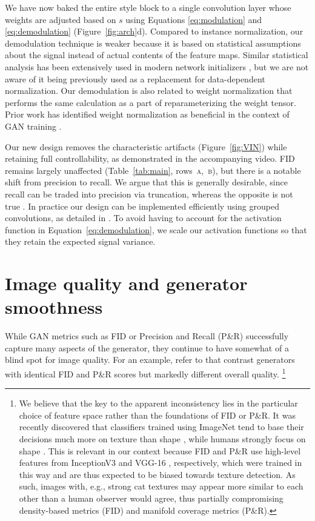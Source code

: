\documentclass[10pt,twocolumn,letterpaper]{article}
\newcommand{\arch}[1]{\textsc{#1}}
\begin{document}
\tabmain %

We have now baked the entire style block to a single convolution layer whose weights are adjusted based on $s$ using Equations \ref{eq:modulation} and \ref{eq:demodulation} (Figure~\ref{fig:arch}d). Compared to instance normalization, our demodulation technique is weaker because it is based on statistical assumptions about the signal instead of actual contents of the feature maps. Similar statistical analysis has been extensively used in modern network initializers \cite{Glorot2010,He2015}, but we are not aware of it being previously used as a replacement for data-dependent normalization.
Our demodulation is also related to weight normalization \cite{Salimans2016A} that performs the same calculation as a part of reparameterizing the weight tensor.
Prior work has identified weight normalization as beneficial in the context of GAN training \cite{Xiang2017}.

Our new design removes the characteristic artifacts (Figure~\ref{fig:VIN}) while retaining full controllability, as demonstrated in the accompanying video.
FID remains largely unaffected (Table~\ref{tab:main}, rows~\arch{a},~\arch{b}), but there is a notable shift from precision to recall.
We argue that this is generally desirable, since recall can be traded into precision via truncation, whereas the opposite is not true \cite{Tuomas2019}.
In practice our design can be implemented efficiently using grouped convolutions, as detailed in .
To avoid having to account for the activation function in Equation~\ref{eq:demodulation}, we scale our activation functions so that they retain the expected signal variance.

\section{Image quality and generator smoothness}
\label{sec:Greg}

\figVIN  %

While GAN metrics such as FID or Precision and Recall (P\&R) successfully capture many aspects of the generator, they continue to have somewhat of a blind spot for image quality. For an example, refer to 
 that contrast generators with identical FID and P\&R scores but markedly different overall quality.%
\footnote{%
We believe that the key to the apparent inconsistency lies in the particular choice of feature space rather than the foundations of FID or P\&R.
It was recently discovered that classifiers trained using ImageNet \cite{Russakovsky2014} tend to base their decisions much more on texture than shape \cite{Geirhos2018}, while humans strongly focus on shape \cite{Landau1988}. 
This is relevant in our context because FID and P\&R use high-level features from InceptionV3 \cite{simonyan2014} and VGG-16 \cite{simonyan2014}, respectively, which were trained in this way and are thus expected to be biased towards texture detection. 
As such, images with, e.g., strong cat textures may appear more similar to each other than a human observer would agree, thus partially compromising density-based metrics (FID) and manifold coverage metrics (P\&R).
}
\end{document}
